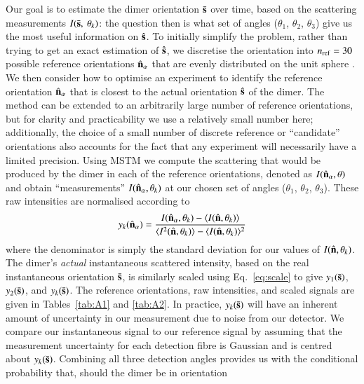 \documentclass[final, 3p]{elsarticle}
\begin{document}
Our goal is to estimate the dimer orientation $\bar{\bf s}$ over time,
based on the scattering measurements $I(\bar{\bf s},\ \theta_k)$: the
question then is what set of angles ($\theta_1$, $\theta_2$,
$\theta_3$) give us the most useful information on $\hat{\bf s}$.  To
initially simplify the problem, rather than trying to get an exact
estimation of $\hat{\bf s}$, we discretise the orientation into
$n_{\rm ref}=30$ possible reference orientations $\hat{\bf n}_\alpha$
that are evenly distributed on the unit sphere \cite{Rey2006}.
%
We then consider how to optimise an experiment to identify the
reference orientation $\hat{\bf n}_\alpha$ that is closest to the
actual orientation $\hat{\bf s}$ of the dimer.
%
The method can be extended to an arbitrarily large number of reference
orientations, but for clarity and practicability we use a relatively
small number here; additionally, the choice of a small number of
discrete reference or ``candidate'' orientations also accounts for the
fact that any experiment will necessarily have a limited precision.
%
Using MSTM we compute the scattering that would be produced by the
dimer in each of the reference orientations, denoted as
$I(\hat{\bf n}_\alpha, \theta)$ and obtain ``measurements''
$I(\hat{\bf n}_\alpha, \theta_k)$ at our chosen set of angles
($\theta_1$, $\theta_2$, $\theta_3$).
%
These raw intensities are normalised according to
\begin{align}
\label{eq:scale}
  y_k(\hat{\bf n}_\alpha)
  = 
  \frac{I(\hat{\bf n}_\alpha, \theta_k) - \langle I(\hat{\bf n},\theta_k) \rangle } 
  {\langle I^2(\hat{\bf n},\theta_k) \rangle -\langle I(\hat{\bf n}, \theta_k)\rangle^2}
\end{align}
where the denominator is simply the standard deviation for our values
of $I(\hat{\bf n}, \theta_k)$.  The dimer's \emph{actual}
instantaneous scattered intensity, based on the real instantaneous
orientation $\bar{\bf s}$, is similarly scaled using
Eq.~\eqref{eq:scale} to give $y_1(\bar{\bf s})$, $y_2(\bar{\bf s})$,
and $y_k(\bar{\bf s})$.
%
The reference orientations, raw intensities, and scaled signals are
given in Tables~\ref{tab:A1} and \ref{tab:A2}.
%
In practice, $y_k(\bar{\bf s})$ will have an inherent amount of
uncertainty in our measurement due to noise from our detector.  We
compare our instantaneous signal to our reference signal by assuming
that the measurement uncertainty for each detection fibre is Gaussian
and is centred about $y_k(\bar{\bf s})$.
%
Combining all three detection angles provides us with the conditional
probability that, should the dimer be in orientation
\end{document}
